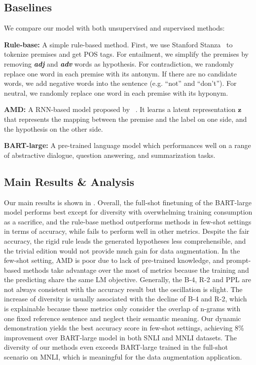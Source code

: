 \subsection{Baselines}
\label{sec:baseline}
We compare our model with both unsupervised and supervised methods:

\noindent
\textbf{Rule-base:} A simple rule-based method. First, we use Stanford Stanza~\citep{qi2020stanza} to tokenize premises and get POS tags. For entailment, we simplify the premises by removing \textbf{\textit{adj}} and \textbf{\textit{adv}} words as hypothesis. For contradiction, we randomly replace one word in each premise with its antonym. If there are no candidate words, we add negative words into the sentence (e.g. ``not'' and ``don't''). For neutral, we randomly replace one word in each premise with its hyponym.

\noindent
\textbf{AMD:} A RNN-based model proposed by ~\citet{DBLP:journals/csl/StarcM17}. It learns a latent representation $\mathbf{z}$ that represents the mapping between the premise and the
label on one side, and the hypothesis on the other side.

\noindent
\textbf{BART-large:} A pre-trained language model which performances well on a range of abstractive dialogue, question answering, and summarization tasks.

\subsection{Main Results \& Analysis}
\label{sec:ana}
Our main results is shown in . Overall, the full-shot finetuning of the BART-large model performs best except for diversity with overwhelming training consumption as a sacrifice, and the rule-base method outperforms methods in few-shot settings in terms of accuracy, while fails to perform well in other metrics. Despite the fair accuracy, the rigid rule leads the generated hypotheses less comprehensible, and the trivial edition would not provide much gain for data augmentation. In the few-shot setting, AMD is poor due to lack of pre-trained knowledge, and prompt-based methods take advantage over the most of metrics because the training and the predicting share the same LM objective. 
Generally, the B-4, R-2 and PPL are not always consistent with the accuracy result but the oscillation is slight. The increase of diversity is usually associated with the decline of B-4 and R-2, which is explainable because these metrics only consider the overlap of n-grams with one fixed reference sentence and neglect their semantic meaning. Our dynamic demonstration yields the best accuracy score in few-shot settings, achieving 8\% improvement over BART-large model in both SNLI and MNLI datasets. The diversity of our methods even exceeds BART-large trained in the full-shot scenario on MNLI, which is meaningful for the data augmentation application. 

